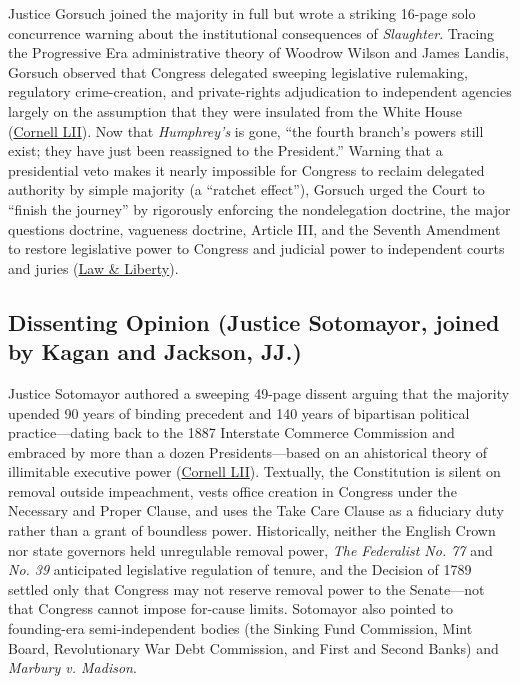 \documentclass[12pt]{article}
\begin{document}
Justice Gorsuch joined the majority in full but wrote a striking 16-page solo concurrence warning about the institutional consequences of \textit{Slaughter}. Tracing the Progressive Era administrative theory of Woodrow Wilson and James Landis, Gorsuch observed that Congress delegated sweeping legislative rulemaking, regulatory crime-creation, and private-rights adjudication to independent agencies largely on the assumption that they were insulated from the White House (\href{https://www.law.cornell.edu/supremecourt/text/25-332}{Cornell LII}). Now that \textit{Humphrey's} is gone, ``the fourth branch's powers still exist; they have just been reassigned to the President.'' Warning that a presidential veto makes it nearly impossible for Congress to reclaim delegated authority by simple majority (a ``ratchet effect''), Gorsuch urged the Court to ``finish the journey'' by rigorously enforcing the nondelegation doctrine, the major questions doctrine, vagueness doctrine, Article III, and the Seventh Amendment to restore legislative power to Congress and judicial power to independent courts and juries (\href{https://lawliberty.org/gorsuchs-con-jority-opinion-in-slaughter/}{Law \& Liberty}).

\subsection{Dissenting Opinion (Justice Sotomayor, joined by Kagan and Jackson, JJ.)}

Justice Sotomayor authored a sweeping 49-page dissent arguing that the majority upended 90 years of binding precedent and 140 years of bipartisan political practice---dating back to the 1887 Interstate Commerce Commission and embraced by more than a dozen Presidents---based on an ahistorical theory of illimitable executive power (\href{https://www.law.cornell.edu/supremecourt/text/25-332}{Cornell LII}). Textually, the Constitution is silent on removal outside impeachment, vests office creation in Congress under the Necessary and Proper Clause, and uses the Take Care Clause as a fiduciary duty rather than a grant of boundless power. Historically, neither the English Crown nor state governors held unregulable removal power, \textit{The Federalist No. 77} and \textit{No. 39} anticipated legislative regulation of tenure, and the Decision of 1789 settled only that Congress may not reserve removal power to the Senate---not that Congress cannot impose for-cause limits. Sotomayor also pointed to founding-era semi-independent bodies (the Sinking Fund Commission, Mint Board, Revolutionary War Debt Commission, and First and Second Banks) and \textit{Marbury v. Madison}.
\end{document}
